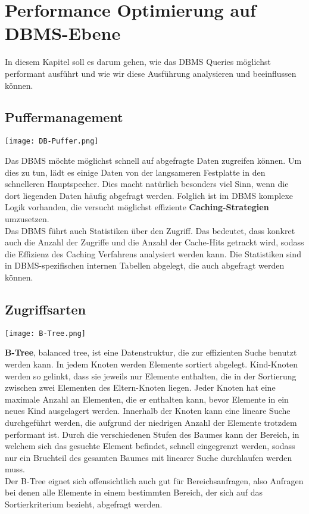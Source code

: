 \section{Performance Optimierung auf DBMS-Ebene}

In diesem Kapitel soll es darum gehen, wie das DBMS Queries möglichst performant ausführt und wie wir diese Ausführung analysieren und beeinflussen können.

\subsection{Puffermanagement}

\texttt{[image: DB-Puffer.png]}

Das DBMS möchte möglichst schnell auf abgefragte Daten zugreifen können. Um dies zu tun, lädt es einige Daten von der langsameren Festplatte in den schnelleren Hauptspecher. Dies macht natürlich besonders viel Sinn, wenn die dort liegenden Daten häufig abgefragt werden. Folglich ist im DBMS komplexe Logik vorhanden, die versucht möglichst effiziente \textbf{Caching-Strategien} umzusetzen. \\

Das DBMS führt auch Statistiken über den Zugriff. Das bedeutet, dass konkret auch die Anzahl der Zugriffe und die Anzahl der Cache-Hits getrackt wird, sodass die Effizienz des Caching Verfahrens analysiert werden kann. Die Statistiken sind in DBMS-spezifischen internen Tabellen abgelegt, die auch abgefragt werden können.

\subsection{Zugriffsarten}

\texttt{[image: B-Tree.png]}

\textbf{B-Tree}, balanced tree, ist eine Datenstruktur, die zur effizienten Suche benutzt werden kann. In jedem Knoten werden Elemente sortiert abgelegt. Kind-Knoten werden so gelinkt, dass sie jeweils nur Elemente enthalten, die in der Sortierung zwischen zwei Elementen des Eltern-Knoten liegen. Jeder Knoten hat eine maximale Anzahl an Elementen, die er enthalten kann, bevor Elemente in ein neues Kind ausgelagert werden. Innerhalb der Knoten kann eine lineare Suche durchgeführt werden, die aufgrund der niedrigen Anzahl der Elemente trotzdem performant ist. Durch die verschiedenen Stufen des Baumes kann der Bereich, in welchem sich das gesuchte Element befindet, schnell eingegrenzt werden, sodass nur ein Bruchteil des gesamten Baumes mit linearer Suche durchlaufen werden muss. \\
Der B-Tree eignet sich offensichtlich auch gut für Bereichsanfragen, also Anfragen bei denen alle Elemente in einem bestimmten Bereich, der sich auf das Sortierkriterium bezieht, abgefragt werden.

